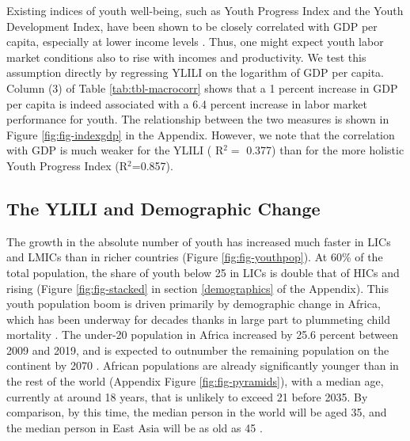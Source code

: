 \documentclass[
  a4paper, twoside, 12pt]{book}
\begin{document}
Existing indices of youth well-being, such as Youth Progress Index and the Youth Development Index, have been shown to be closely correlated with GDP per capita, especially at lower income levels \autocite{sen2016,lisney2018}. Thus, one might expect youth labor market conditions also to rise with incomes and productivity. We test this assumption directly by regressing YLILI on the logarithm of GDP per capita. Column (3) of Table \ref{tab:tbl-macrocorr} shows that a 1 percent increase in GDP per capita is indeed associated with a 6.4 percent increase in labor market performance for youth. The relationship between the two measures is shown in Figure \ref{fig:fig-indexgdp} in the Appendix. However, we note that the correlation with GDP is much weaker for the YLILI ( R\(^2=\) 0.377) than for the more holistic Youth Progress Index (R\(^2\)=0.857).

\hypertarget{the-ylili-and-demographic-change}{%
\subsection{The YLILI and Demographic Change}\label{the-ylili-and-demographic-change}}

The growth in the absolute number of youth has increased much faster in LICs and LMICs than in richer countries (Figure \ref{fig:fig-youthpop}). At 60\% of the total population, the share of youth below 25 in LICs is double that of HICs and rising (Figure \ref{fig:fig-stacked} in section \ref{demographics} of the Appendix). This youth population boom is driven primarily by demographic change in Africa, which has been underway for decades thanks in large part to plummeting child mortality \autocite{ortiz-ospina2016}. The under-20 population in Africa increased by 25.6 percent between 2009 and 2019, and is expected to outnumber the remaining population on the continent by 2070 \autocite{africandevelopmentbank2019}. African populations are already significantly younger than in the rest of the world (Appendix Figure \ref{fig:fig-pyramids}), with a median age, currently at around 18 years, that is unlikely to exceed 21 before 2035. By comparison, by this time, the median person in the world will be aged 35, and the median person in East Asia will be as old as 45 \autocite{filmer2014}.
\end{document}

